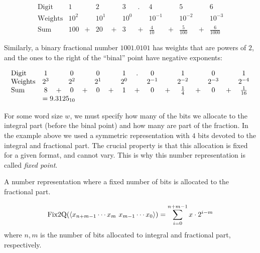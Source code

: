 \begin{example}
\[
  \begin{array}{lcccccccccccccc}
    \mathrm{Digit}   &1&&2&&3&.&4&&5&&6 \\
    \mathrm{Weights} & 10^{2} && 10^{1} && 10^{0} && 10^{-1} && 10^{-2} && 10^{-3} \\
    \mathrm{Sum} & 100 &+& 20 &+& 3 &+& \frac{4}{10} &+& \frac{5}{100} &+& \frac{6}{1000}
  \end{array}
\]
\end{example}
Similarly, a binary fractional number $1001.0101$ has weights that are
powers of $2$, and the ones to the right of the ``binal'' point have
negative exponents:
\begin{example}
\[
  \begin{array}{lcccccccccccccccc}
    \mathrm{Digit}   &1&&0&&0&&1&.&0&&1&&0&&1 \\
    \mathrm{Weights} & 2^{3} && 2^{2} && 2^{1} && 2^{0} && 2^{-1} && 2^{-2} && 2^{-3} && 2^{-4} \\                                                                          \mathrm{Sum} & 8 &+& 0 &+& 0 &+& 1 &+& 0 &+& \frac{1}{4} &+& 0 &+& \frac{1}{16} \\
    &\multicolumn{8}{l}{= 9.3125_{10}}
  \end{array}
\]
\end{example}

For some word size $w$, we must specify how many of the bits we
allocate to the integral part (before the binal point) and how many
are part of the fraction.  In the example above we used a symmetric
representation with $4$ bits devoted to the integral and fractional
part.  The crucial property is that this allocation is fixed for a
given format, and cannot vary.  This is why this number representation
is called \emph{fixed point}.

\begin{definition}
  A number representation where a fixed number of bits is allocated to
  the fractional part.
\end{definition}

\begin{definition}
  \[
    \mathrm{Fix2Q}(\langle x_{n+m-1}\cdots x_{m}~x_{m-1}\cdots x_{0} \rangle) =
    \sum_{i=0}^{n+m-1} x \cdot 2^{i-m}
  \]
  where $n,m$ is the number of bits allocated to integral and
  fractional part, respectively.
  \label{def:fx2Q}
\end{definition}


